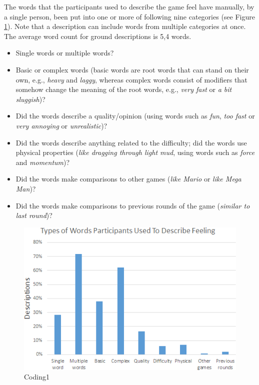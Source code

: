 The words that the participants used to describe the game feel have manually, by a single person, been put into one or more of following nine categories (see Figure \ref{fig:coding1}). Note that a description can include words from multiple categories at once. The average word count for ground descriptions is 5,4 words.
\begin{itemize}[noitemsep,nolistsep]
\item Single words or multiple words?
\item Basic or complex words (basic words are root words that can stand on their own, e.g., \textit{heavy} and \textit{laggy}, whereas complex words consist of modifiers that somehow change the meaning of the root words, e.g., \textit{very fast} or \textit{a bit sluggish})?
\item Did the words describe a quality/opinion (using words such as \textit{fun}, \textit{too fast} or \textit{very annoying} or \textit{unrealistic})?
\item Did the words describe anything related to the difficulty; did the words use physical properties (\textit{like dragging through light mud}, using words such as \textit{force} and \textit{momentum})?
\item Did the words make comparisons to other games (\textit{like Mario} or \textit{like Mega Man})?
\item Did the words make comparisons to previous rounds of the game (\textit{similar to last round})?
\end{itemize}

\begin{figure}[htbp]
\centering
\includegraphics[width=\columnwidth]{Pics/coding1}
\caption{Coding1}
\label{fig:coding1}
\end{figure}

